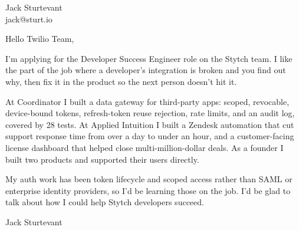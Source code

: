 \documentclass[11pt]{article}
\begin{document}
\raggedright

{\namefont\fontsize{20pt}{24pt}\selectfont Jack Sturtevant}\\[-0.3em]
jack@sturt.io

\vspace{1.2em}

Hello Twilio Team,

I'm applying for the Developer Success Engineer role on the Stytch team. I like the part of the job where a developer's integration is broken and you find out why, then fix it in the product so the next person doesn't hit it.

At Coordinator I built a data gateway for third-party apps: scoped, revocable, device-bound tokens, refresh-token reuse rejection, rate limits, and an audit log, covered by 28 tests. At Applied Intuition I built a Zendesk automation that cut support response time from over a day to under an hour, and a customer-facing license dashboard that helped close multi-million-dollar deals. As a founder I built two products and supported their users directly.

My auth work has been token lifecycle and scoped access rather than SAML or enterprise identity providers, so I'd be learning those on the job. I'd be glad to talk about how I could help Stytch developers succeed.

\vspace{0.6em}
Jack Sturtevant
\end{document}
